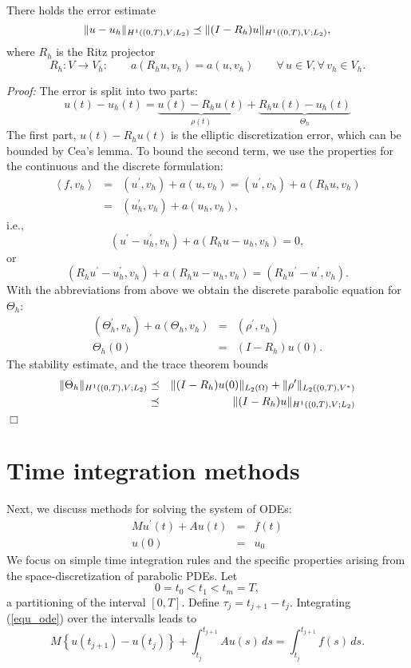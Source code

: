 \begin{theorem}
There holds the error estimate
$$
\| u - u_h \|_{H^1((0,T),V;L_2)} \preceq  \| (I-R_h) u \|_{H^1((0,T),V;L_2)},
$$
where $R_h$ is the Ritz projector
$$
R_h : V \rightarrow V_h : \qquad a(R_h u, v_h) = a(u,v_h) \qquad \forall \, u \in V, \forall \, v_h \in V_h.
$$
\end{theorem}
{\em Proof:} 
The error is split into two parts:
$$
u(t) - u_h(t) = \underbrace{u(t)-R_h u(t)}_{\rho(t)} + \underbrace{R_h u(t) - u_h(t)}_{\Theta_h}
$$
The first part, $u(t) - R_h u(t)$ is the elliptic discretization error, which can be bounded by
Cea's lemma. To bound the second term, we use the properties for the continuous and the
discrete formulation:
\begin{eqnarray*}
\left<f,v_h\right> & = & (u^\prime,v_h) + a(u, v_h) = (u^\prime,v_h) + a(R_h u, v_h) \\
& = & (u_h^\prime, v_h) + a(u_h, v_h),
\end{eqnarray*}
i.e.,
$$
(u^\prime - u_h^\prime, v_h) + a(R_h u - u_h, v_h) = 0,
$$
or
$$
(R_h u^\prime - u_h^\prime, v_h) + a(R_h u - u_h, v_h) = (R_h u^\prime - u^\prime, v_h).
$$
With the abbreviations from above we obtain the discrete parabolic equation for $\Theta_h$:
\begin{eqnarray*}
(\Theta_h^\prime, v_h) + a (\Theta_h, v_h) & = & (\rho^\prime, v_h)  \\
\Theta_h(0) & = & (I-R_h) u(0).
\end{eqnarray*}
The stability estimate, and the trace theorem bounds
\begin{eqnarray*}
\| \Theta_h \|_{H^1((0,T),V;L_2)}
 & \preceq &  \| (I-R_h) u(0) \|_{L_2(\Omega)} + \| \rho^\prime \|_{L_2((0,T),V^\ast)} \\
 & \preceq & \| (I-R_h) u \|_{H^1((0,T),V;L_2)}
\end{eqnarray*}
\hfill $\Box$

\section{Time integration methods}
Next, we discuss methods for solving the system of ODEs:
\begin{eqnarray}
M u^\prime(t) + A u(t) & = & f(t) \label{equ_ode} \\
u(0) & = & u_0  \nonumber
\end{eqnarray}
We focus on simple time integration rules and the specific properties arising from
the space-discretization of parabolic PDEs. Let 
$$
0 = t_0 < t_1 < t_m = T,
$$
a partitioning of the interval $[0,T]$. Define $\tau_j = t_{j+1}-t_j$.
Integrating (\ref{equ_ode}) over the intervalls leads to
$$
M \left\{ u(t_{j+1}) - u(t_j)  \right\} + \int_{t_j}^{t_{j+1}} A u(s) \, ds = \int_{t_j}^{t_{j+1}} f(s) \, ds.
$$

